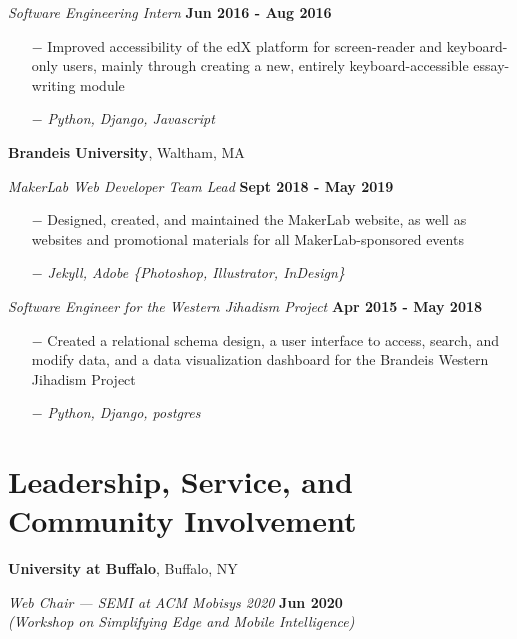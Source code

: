 \documentclass[margin,line]{res}
\begin{document}
\begin{resume}
\vspace{-.3cm}
{\em Software Engineering Intern} \hfill {\bf Jun 2016 - Aug 2016}
\begin{itemize}
  \setlength\itemsep{-.2em} 
  \item[$-$] Improved accessibility of the edX platform for screen-reader and keyboard-only users, mainly through creating a new, entirely keyboard-accessible essay-writing module
  \item[$-$] \textit{Python, Django, Javascript}
\end{itemize}

{\bf Brandeis University}, Waltham, MA 

\vspace{-.3cm}
{\em MakerLab Web Developer Team Lead} \hfill {\bf Sept 2018 - May 2019}
\begin{itemize}
  \setlength\itemsep{-.2em} 
  \item[$-$] Designed, created, and maintained the MakerLab website, as well as websites and promotional materials for all MakerLab-sponsored events
  \item[$-$] \textit{Jekyll, Adobe \{Photoshop, Illustrator, InDesign\}}
\end{itemize}

\vspace{-.3cm}
{\em Software Engineer for the Western Jihadism Project} \hfill {\bf Apr 2015 - May 2018}
\begin{itemize}
  \setlength\itemsep{-.2em} 
  \item[$-$] Created a relational schema design, a user interface to access, search, and modify data, and a data visualization dashboard for the Brandeis Western Jihadism Project
    \item[$-$] \textit{Python, Django, postgres}
\end{itemize}


\section{\sc Leadership, Service, and Community Involvement} 
{\bf University at Buffalo}, Buffalo, NY 


\vspace{-.3cm}
{\em Web Chair --- SEMI at ACM Mobisys 2020 } \hfill {\bf Jun 2020} \\
{\em (Workshop on Simplifying Edge and Mobile Intelligence)}



\end{resume}
\end{document}
